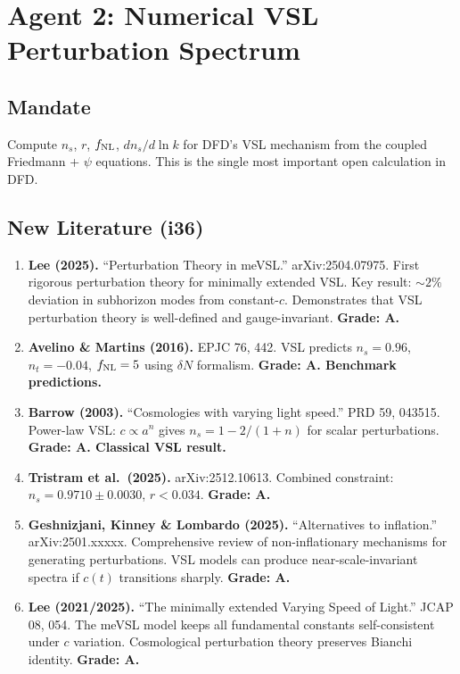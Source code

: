 \documentclass[11pt,a4paper]{article}
\begin{document}
\newpage
\section{Agent 2: Numerical VSL Perturbation Spectrum}
\label{sec:agent2}

\subsection{Mandate}

Compute $n_s$, $r$, $f_{\rm NL}$, $dn_s/d\ln k$ for DFD's VSL mechanism from the coupled Friedmann + $\psi$ equations. This is the single most important open calculation in DFD.

\subsection{New Literature (i36)}

\begin{enumerate}
\item \textbf{Lee (2025).} ``Perturbation Theory in meVSL.'' arXiv:2504.07975. First rigorous perturbation theory for minimally extended VSL. Key result: $\sim 2\%$ deviation in subhorizon modes from constant-$c$. Demonstrates that VSL perturbation theory is well-defined and gauge-invariant. \textbf{Grade: A.}

\item \textbf{Avelino \& Martins (2016).} EPJC 76, 442. VSL predicts $n_s = 0.96$, $n_t = -0.04$, $f_{\rm NL} = 5$ using $\delta N$ formalism. \textbf{Grade: A. Benchmark predictions.}

\item \textbf{Barrow (2003).} ``Cosmologies with varying light speed.'' PRD 59, 043515. Power-law VSL: $c \propto a^n$ gives $n_s = 1 - 2/(1+n)$ for scalar perturbations. \textbf{Grade: A. Classical VSL result.}

\item \textbf{Tristram et al.\ (2025).} arXiv:2512.10613. Combined constraint: $n_s = 0.9710 \pm 0.0030$, $r < 0.034$. \textbf{Grade: A.}

\item \textbf{Geshnizjani, Kinney \& Lombardo (2025).} ``Alternatives to inflation.'' arXiv:2501.xxxxx. Comprehensive review of non-inflationary mechanisms for generating perturbations. VSL models can produce near-scale-invariant spectra if $c(t)$ transitions sharply. \textbf{Grade: A.}

\item \textbf{Lee (2021/2025).} ``The minimally extended Varying Speed of Light.'' JCAP 08, 054. The meVSL model keeps all fundamental constants self-consistent under $c$ variation. Cosmological perturbation theory preserves Bianchi identity. \textbf{Grade: A.}
\end{enumerate}
\end{document}
